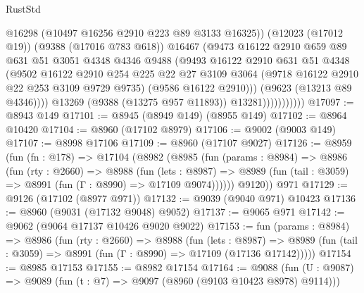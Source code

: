 \begin{lexlean}{RustStd}
\begin{coremodule}
                              @16298
                              (@10497 @16256 @2910 @223 @89 @3133 @16325))
                            (@12023 (@17012 @19))
                            (@9388 (@17016 @783 @618))
                            @16467
                            (@9473
                              @16122
                              @2910
                              @659
                              @89
                              @631
                              @51
                              @3051
                              @4348
                              @4346
                              @9488
                              (@9493
                                @16122
                                @2910
                                @631
                                @51
                                @4348
                                (@9502
                                  @16122
                                  @2910
                                  @254
                                  @225
                                  @22
                                  @27
                                  @3109
                                  @3064
                                  (@9718 @16122 @2910 @22 @253 @3109 @9729 @9735)
                                  (@9586 @16122 @2910)))
                              (@9623 (@13213 @89 @4346))))
                          @13269
                          (@9388 (@13275 @957 @11893))
                          @13281)))))))))))
@17097 := @8943 @149
@17101 := @8945 (@8949 @149) (@8955 @149)
@17102 := @8964 @10420
@17104 := @8960 (@17102 @8979)
@17106 := @9002 (@9003 @149)
@17107 := @8998 @17106
@17109 := @8960 (@17107 @9027)
@17126 := @8959
    (fun (fn : @178) =>
    @17104
      (@8982
        (@8985
          (fun (params : @8984) =>
          @8986
            (fun (rty : @2660) =>
            @8988
              (fun (lets : @8987) =>
              @8989 (fun (tail : @3059) => @8991 (fun (Γ : @8990) => @17109 @9074))))))
        @9120))
    @971
@17129 := @9126 (@17102 (@8977 @971))
@17132 := @9039 (@9040 @971) @10423
@17136 := @8960 (@9031 (@17132 @9048) @9052)
@17137 := @9065 @971
@17142 := @9062 (@9064 @17137 @10426 @9020 @9022)
@17153 := fun (params : @8984) =>
  @8986
    (fun (rty : @2660) =>
    @8988
      (fun (lets : @8987) =>
      @8989 (fun (tail : @3059) => @8991 (fun (Γ : @8990) => @17109 (@17136 @17142)))))
@17154 := @8985 @17153
@17155 := @8982 @17154
@17164 := @9088
    (fun (U : @9087) => @9089 (fun (t : @7) => @9097 (@8960 (@9103 @10423 @8978) @9114)))

\end{coremodule}
\end{lexlean}
